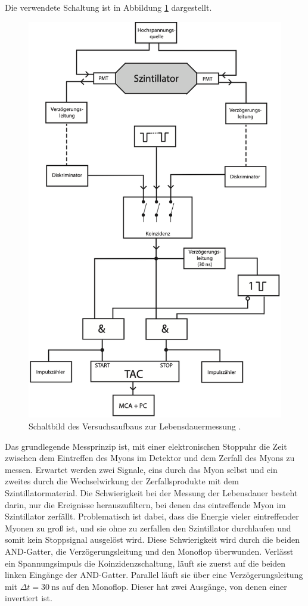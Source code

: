 Die verwendete Schaltung ist in Abbildung \ref{fig:schaltung} dargestellt. 
\begin{figure}
    \centering
    \includegraphics[width=0.6\linewidth]{schaltung.png}
    \caption{Schaltbild des Versuchsaufbaus zur Lebensdauermessung \cite{anleitung}.}
    \label{fig:schaltung}
\end{figure}
Das grundlegende Messprinzip ist, mit einer elektronischen Stoppuhr die Zeit zwischen
dem Eintreffen des Myons im Detektor und dem Zerfall des Myons zu messen. Erwartet werden zwei Signale, 
eins durch das Myon selbst und ein zweites durch die Wechselwirkung der Zerfallsprodukte mit dem 
Szintillatormaterial. 
Die Schwierigkeit bei der Messung der Lebensdauer besteht darin, nur die Ereignisse herauszufiltern, bei 
denen das eintreffende Myon im Szintillator zerfällt.
Problematisch ist dabei, dass die Energie vieler eintreffender Myonen zu groß ist, und sie ohne zu 
zerfallen den Szintillator durchlaufen und somit kein Stoppsignal ausgelöst wird.
Diese Schwierigkeit wird durch die beiden AND-Gatter, die Verzögerungsleitung und den Monoflop überwunden.
Verlässt ein Spannungsimpuls die Koinzidenzschaltung, läuft sie zuerst auf die beiden linken Eingänge
der AND-Gatter. Parallel läuft sie über eine Verzögerungsleitung mit $\Delta t = \SI{30}{\nano\second}$ auf 
den Monoflop. Dieser hat zwei Ausgänge, von denen einer invertiert ist. 
